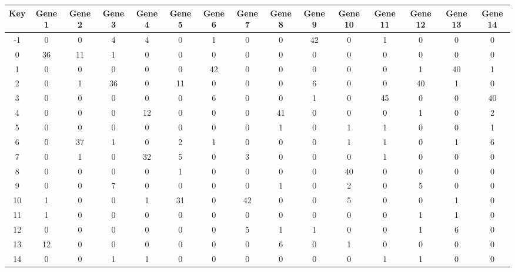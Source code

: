 \begin{tabular}{|c|c|c|c|c|c|c|c|c|c|c|c|c|c|c|}
\hline
Key & Gene 1 & Gene 2 & Gene 3 & Gene 4 & Gene 5 & Gene 6 & Gene 7 & Gene 8 & Gene 9 & Gene 10 & Gene 11 & Gene 12 & Gene 13 & Gene 14 \\
\hline
-1 & 0 & 0 & 4 & 4 & 0 & 1 & 0 & 0 & 42 & 0 & 1 & 0 & 0 & 0 \\
0 & 36 & 11 & 1 & 0 & 0 & 0 & 0 & 0 & 0 & 0 & 0 & 0 & 0 & 0 \\
1 & 0 & 0 & 0 & 0 & 0 & 42 & 0 & 0 & 0 & 0 & 0 & 1 & 40 & 1 \\
2 & 0 & 1 & 36 & 0 & 11 & 0 & 0 & 0 & 6 & 0 & 0 & 40 & 1 & 0 \\
3 & 0 & 0 & 0 & 0 & 0 & 6 & 0 & 0 & 1 & 0 & 45 & 0 & 0 & 40 \\
4 & 0 & 0 & 0 & 12 & 0 & 0 & 0 & 41 & 0 & 0 & 0 & 1 & 0 & 2 \\
5 & 0 & 0 & 0 & 0 & 0 & 0 & 0 & 1 & 0 & 1 & 1 & 0 & 0 & 1 \\
6 & 0 & 37 & 1 & 0 & 2 & 1 & 0 & 0 & 0 & 1 & 1 & 0 & 1 & 6 \\
7 & 0 & 1 & 0 & 32 & 5 & 0 & 3 & 0 & 0 & 0 & 1 & 0 & 0 & 0 \\
8 & 0 & 0 & 0 & 0 & 1 & 0 & 0 & 0 & 0 & 40 & 0 & 0 & 0 & 0 \\
9 & 0 & 0 & 7 & 0 & 0 & 0 & 0 & 1 & 0 & 2 & 0 & 5 & 0 & 0 \\
10 & 1 & 0 & 0 & 1 & 31 & 0 & 42 & 0 & 0 & 5 & 0 & 0 & 1 & 0 \\
11 & 1 & 0 & 0 & 0 & 0 & 0 & 0 & 0 & 0 & 0 & 0 & 1 & 1 & 0 \\
12 & 0 & 0 & 0 & 0 & 0 & 0 & 5 & 1 & 1 & 0 & 0 & 1 & 6 & 0 \\
13 & 12 & 0 & 0 & 0 & 0 & 0 & 0 & 6 & 0 & 1 & 0 & 0 & 0 & 0 \\
14 & 0 & 0 & 1 & 1 & 0 & 0 & 0 & 0 & 0 & 0 & 1 & 1 & 0 & 0 \\
\hline
\end{tabular}